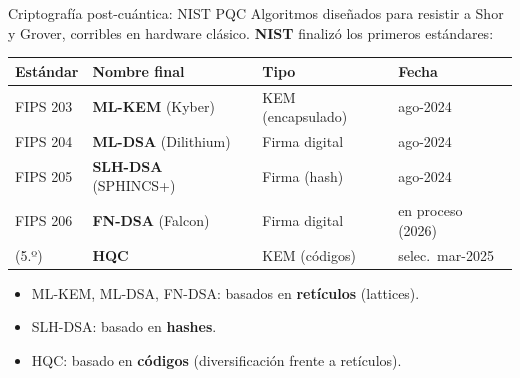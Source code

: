 \documentclass[aspectratio=169]{beamer}
\begin{document}
\begin{frame}{Criptografía post-cuántica: NIST PQC}
  Algoritmos diseñados para resistir a Shor y Grover, corribles en hardware
  clásico. \textbf{NIST} finalizó los primeros estándares:

  \begin{center}
  {\small
  \begin{tabular}{llll}
    \toprule
    \textbf{Estándar} & \textbf{Nombre final} & \textbf{Tipo} & \textbf{Fecha} \\
    \midrule
    FIPS 203 & \textbf{ML-KEM} (Kyber)     & KEM (encapsulado) & ago-2024 \\
    FIPS 204 & \textbf{ML-DSA} (Dilithium) & Firma digital     & ago-2024 \\
    FIPS 205 & \textbf{SLH-DSA} (SPHINCS+) & Firma (hash)      & ago-2024 \\
    FIPS 206 & \textbf{FN-DSA} (Falcon)    & Firma digital     & en proceso (2026) \\
    (5.º)    & \textbf{HQC}                & KEM (códigos)     & selec.\ mar-2025 \\
    \bottomrule
  \end{tabular}
  }
  \end{center}

  \begin{itemize}\small
    \item ML-KEM, ML-DSA, FN-DSA: basados en \textbf{retículos} (lattices).
    \item SLH-DSA: basado en \textbf{hashes}.
    \item HQC: basado en \textbf{códigos} (diversificación frente a retículos).
  \end{itemize}

\end{frame}
\end{document}
